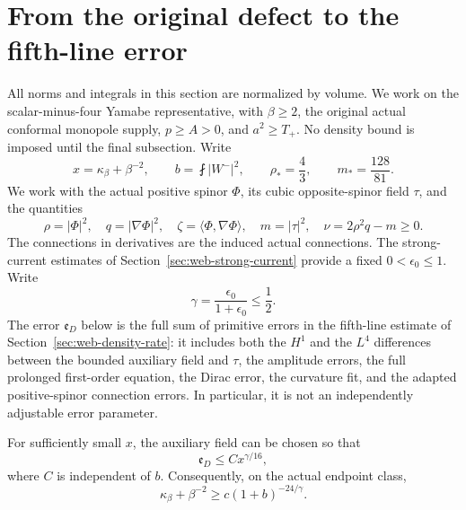 \section{From the original defect to the fifth-line error}
\label{sec:web-primitive-rate}

All norms and integrals in this section are normalized by volume. We
work on the scalar-minus-four Yamabe representative, with $\beta\ge2$,
the original actual conformal monopole supply, $p\ge A>0$, and
$a^2\ge T_+$. No density bound is imposed until the final subsection.
Write
\[
 x=\kappa_\beta+\beta^{-2},\qquad
 b=\fint |W^-|^2,\qquad
 \rho_*=\frac43,\qquad m_*=\frac{128}{81}.
\]
We work with the actual positive spinor $\Phi$, its cubic opposite-spinor
field $\tau$, and the quantities
\[
 \rho=|\Phi|^2,\quad q=|\nabla\Phi|^2,\quad
 \zeta=\langle\Phi,\nabla\Phi\rangle,\quad m=|\tau|^2,
 \quad \nu=2\rho^2q-m\ge0.
\]
The connections in derivatives are the induced actual connections.
The strong-current estimates of Section~\ref{sec:web-strong-current}
provide a fixed $0<\epsilon_0\le1$. Write
\[
 \gamma=\frac{\epsilon_0}{1+\epsilon_0}\le\frac12.
\]
The error $\mathfrak e_D$ below is the full sum of primitive errors in
the fifth-line estimate of Section~\ref{sec:web-density-rate}: it
includes both the $H^1$ and the $L^4$ differences between the bounded
auxiliary field and $\tau$, the amplitude errors, the full prolonged
first-order equation, the Dirac error, the curvature fit, and the
adapted positive-spinor connection errors. In particular, it is not
an independently adjustable error parameter.

\begin{proposition}\label{prop:web-primitive-rate}
For sufficiently small $x$, the auxiliary field can be chosen so that
\[
 \mathfrak e_D\le Cx^{\gamma/16},
\]
where $C$ is independent of $b$. Consequently, on the actual endpoint
class,
\begin{equation}\label{eq:web-polynomial-density}
 \kappa_\beta+\beta^{-2}\ge c(1+b)^{-24/\gamma}.
\end{equation}
\end{proposition}

